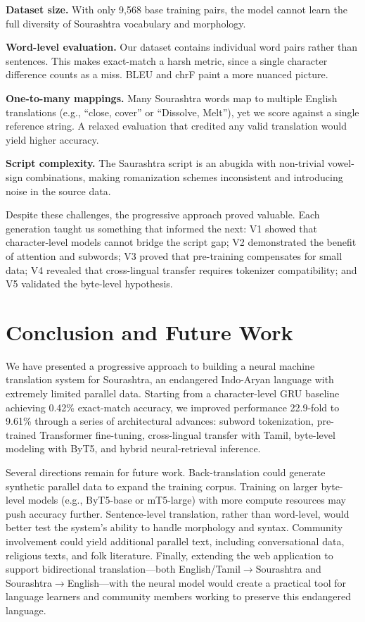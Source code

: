 \documentclass[conference]{IEEEtran}
\begin{document}
\textbf{Dataset size.} With only 9,568 base training pairs, the model cannot learn the full diversity of Sourashtra vocabulary and morphology.

\textbf{Word-level evaluation.} Our dataset contains individual word pairs rather than sentences. This makes exact-match a harsh metric, since a single character difference counts as a miss. BLEU and chrF paint a more nuanced picture.

\textbf{One-to-many mappings.} Many Sourashtra words map to multiple English translations (e.g., ``close, cover'' or ``Dissolve, Melt''), yet we score against a single reference string. A relaxed evaluation that credited any valid translation would yield higher accuracy.

\textbf{Script complexity.} The Saurashtra script is an abugida with non-trivial vowel-sign combinations, making romanization schemes inconsistent and introducing noise in the source data.

Despite these challenges, the progressive approach proved valuable. Each generation taught us something that informed the next: V1 showed that character-level models cannot bridge the script gap; V2 demonstrated the benefit of attention and subwords; V3 proved that pre-training compensates for small data; V4 revealed that cross-lingual transfer requires tokenizer compatibility; and V5 validated the byte-level hypothesis.

\section{Conclusion and Future Work}\label{sec:conclusion}

We have presented a progressive approach to building a neural machine translation system for Sourashtra, an endangered Indo-Aryan language with extremely limited parallel data. Starting from a character-level GRU baseline achieving 0.42\% exact-match accuracy, we improved performance 22.9-fold to 9.61\% through a series of architectural advances: subword tokenization, pre-trained Transformer fine-tuning, cross-lingual transfer with Tamil, byte-level modeling with ByT5, and hybrid neural-retrieval inference.

Several directions remain for future work. Back-translation could generate synthetic parallel data to expand the training corpus. Training on larger byte-level models (e.g., ByT5-base or mT5-large) with more compute resources may push accuracy further. Sentence-level translation, rather than word-level, would better test the system's ability to handle morphology and syntax. Community involvement could yield additional parallel text, including conversational data, religious texts, and folk literature. Finally, extending the web application to support bidirectional translation---both English/Tamil$\rightarrow$Sourashtra and Sourashtra$\rightarrow$English---with the neural model would create a practical tool for language learners and community members working to preserve this endangered language.
\end{document}
